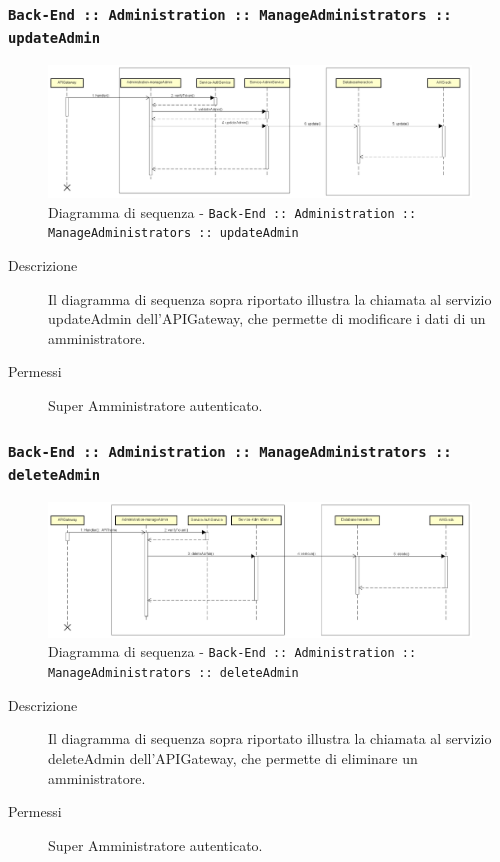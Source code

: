 \documentclass[../DefinizioneDiProdotto_v2.0.0.tex]{subfiles}
\begin{document}
\newpage
\subsubsection{\texttt{Back-End :: Administration :: ManageAdministrators :: updateAdmin}}
\begin{figure}[!h]
	\centering
	\includegraphics[scale=0.3]{DiagrammiSequenza/Back-End/manageAdministrators/updateAdmin.png}
	\caption{Diagramma di sequenza - \texttt{Back-End :: Administration :: ManageAdministrators :: updateAdmin }}
\end{figure}
\begin{description}
	\item [Descrizione] Il diagramma di sequenza sopra riportato illustra la chiamata al servizio updateAdmin dell'APIGateway, che permette di modificare i dati di un amministratore.
	\item [Permessi] Super Amministratore autenticato.
\end{description}

\subsubsection{\texttt{Back-End :: Administration :: ManageAdministrators :: deleteAdmin}}
\begin{figure}[!h]
	\centering
	\includegraphics[scale=0.3]{DiagrammiSequenza/Back-End/manageAdministrators/deleteAdmin.png}
	\caption{Diagramma di sequenza - \texttt{Back-End :: Administration :: ManageAdministrators :: deleteAdmin }}
\end{figure}
\begin{description}
	\item [Descrizione] Il diagramma di sequenza sopra riportato illustra la chiamata al servizio deleteAdmin dell'APIGateway, che permette di eliminare un amministratore.
	\item [Permessi] Super Amministratore autenticato.
\end{description}
\end{document}
